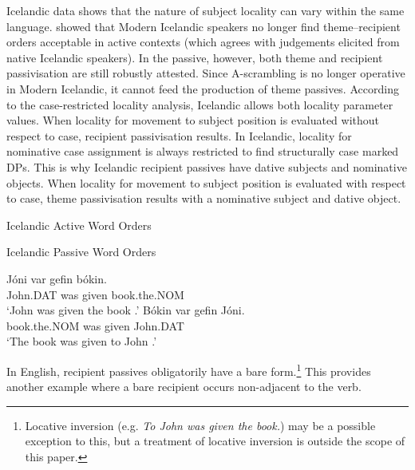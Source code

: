 {Icelandic data shows that the nature of subject locality can vary within the same language. \cite{Dehe.2004} showed that Modern Icelandic speakers no longer find theme--recipient orders acceptable in active contexts (which agrees with judgements elicited from native Icelandic speakers). In the passive, however, both theme and recipient passivisation are still robustly attested. Since A-scrambling is no longer operative in Modern Icelandic, it cannot feed the production of theme passives. According to the case-restricted locality analysis, Icelandic allows both locality parameter values. When locality for movement to subject position is evaluated without respect to case, recipient passivisation results. In Icelandic, locality for nominative case assignment is always restricted to find structurally case marked DPs. This is why Icelandic recipient passives have dative subjects and nominative objects. When locality for movement to subject position is evaluated with respect to case, theme passivisation results with a nominative subject and dative object. 

\begin{exe}
\ex Icelandic Active Word Orders
\begin{xlist}
\end{xlist}
\ex Icelandic Passive Word Orders
\begin{xlist}
\ex \gll J\'{o}ni var gefin b\'{o}kin.\\
John.DAT was given book.the.NOM\\
\trans `John was given the book \citep{Holmberg.1995,Bardal.2001}.'
\ex \gll B\'{o}kin var gefin J\'{o}ni.\\
book.the.NOM was given John.DAT\\
\trans `The book was given to John \citep{Holmberg.1995,Bardal.2001}.'
\end{xlist}
\end{exe}

In English, recipient passives obligatorily have a bare form.\footnote{Locative inversion (e.g. \textit{To John was given the book.}) may be a possible exception to this, but a treatment of locative inversion is outside the scope of this paper.} This provides another example where a bare recipient occurs non-adjacent to the verb.

}
